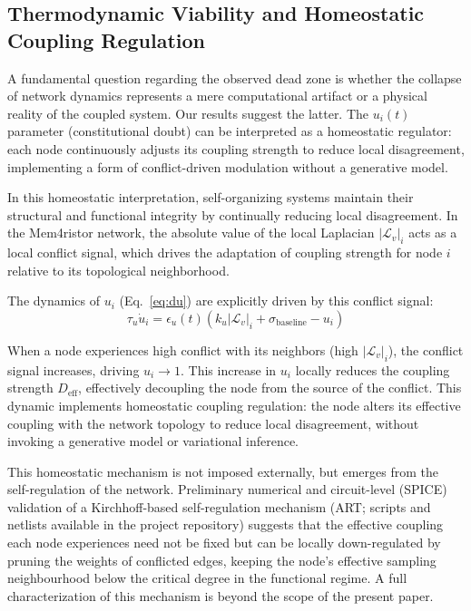 ﻿\documentclass[11pt]{article}
\begin{document}
\subsection{Thermodynamic Viability and Homeostatic Coupling Regulation}

A fundamental question regarding the observed dead zone is whether the collapse of network dynamics represents a mere computational artifact or a physical reality of the coupled system. Our results suggest the latter. The $u_i(t)$ parameter (constitutional doubt) can be interpreted as a homeostatic regulator: each node continuously adjusts its coupling strength to reduce local disagreement, implementing a form of conflict-driven modulation without a generative model.

In this homeostatic interpretation, self-organizing systems maintain their structural and functional integrity by continually reducing local disagreement. In the Mem4ristor network, the absolute value of the local Laplacian $|\mathcal{L}_v|_i$ acts as a local conflict signal, which drives the adaptation of coupling strength for node $i$ relative to its topological neighborhood.

The dynamics of $u_i$ (Eq.~\ref{eq:du}) are explicitly driven by this conflict signal:
\begin{equation*}
\tau_u \dot{u}_i = \epsilon_u(t) \left( k_u |\mathcal{L}_v|_i + \sigma_{\text{baseline}} - u_i \right)
\end{equation*}

When a node experiences high conflict with its neighbors (high $|\mathcal{L}_v|_i$), the conflict signal increases, driving $u_i \to 1$. This increase in $u_i$ locally reduces the coupling strength $D_{\text{eff}}$, effectively decoupling the node from the source of the conflict. This dynamic implements homeostatic coupling regulation: the node alters its effective coupling with the network topology to reduce local disagreement, without invoking a generative model or variational inference.

This homeostatic mechanism is not imposed externally, but emerges from the self-regulation of the network. Preliminary numerical and circuit-level (SPICE) validation of a Kirchhoff-based self-regulation mechanism (ART; scripts and netlists available in the project repository) suggests that the effective coupling each node experiences need not be fixed but can be locally down-regulated by pruning the weights of conflicted edges, keeping the node's effective sampling neighbourhood below the critical degree in the functional regime. A full characterization of this mechanism is beyond the scope of the present paper.
\end{document}
